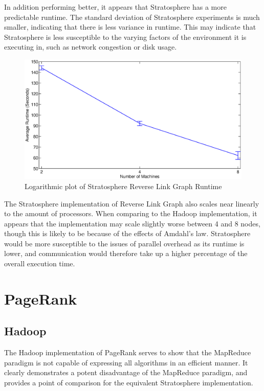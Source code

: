 In addition performing better, it appears that Stratosphere has a more predictable runtime. The standard deviation of Stratosphere experiments is much smaller, indicating that there is less variance in runtime. This may indicate that Stratosphere is less susceptible to the varying factors of the environment it is executing in, such as network congestion or disk usage.  

\begin{figure}[H]
	\centering
	\includegraphics[scale=0.6]{resources/StratRLGScalability.eps}
	\caption{Logarithmic plot of Stratosphere Reverse Link Graph Runtime}
	\label{stratRLGScale}
\end{figure}

The Stratosphere implementation of Reverse Link Graph also scales near linearly to the amount of processors. When comparing to the Hadoop implementation, it appears that the implementation may scale slightly worse between 4 and 8 nodes, though this is likely to be because of the effects of Amdahl's law. Stratosphere would be more susceptible to the issues of parallel overhead as its runtime is lower, and communication would therefore take up a higher percentage of the overall execution time. 

\section{PageRank}

\subsection{Hadoop}
The Hadoop implementation of PageRank serves to show that the MapReduce paradigm is not capable of expressing all algorithms in an efficient manner. It clearly demonstrates a potent disadvantage of the MapReduce paradigm, and provides a point of comparison for the equivalent Stratosphere implementation.

